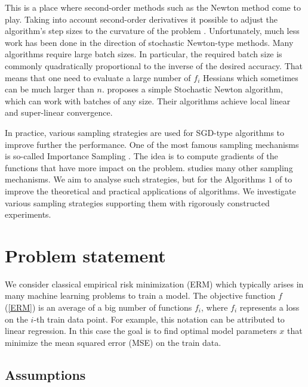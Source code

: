 \documentclass{article}
\theoremstyle{definition}
\theoremstyle{assumption}
\theoremstyle{lemma}
\theoremstyle{theorem}
\theoremstyle{proposition}
\begin{document}
	This is a place where second-order methods such as the Newton method \cite{Nesterov-introductory, Newton-convergence, RSN} come to play. Taking into account second-order derivatives it possible to adjust the algorithm's step sizes to the curvature of the problem \cite{Nesterov-introductory}. Unfortunately, much less work has been done in the direction of stochastic Newton-type methods. Many algorithms \cite{sub-sampled, exact-inexact, variance-reduced-Newton, zhang2022adaptive, tripuraneni2018stochastic, zhou2020stochastic} require large batch sizes. In particular, the required batch size is commonly quadratically proportional to the inverse of the desired accuracy. That means that one need to evaluate a large number of $f_i$ Hessians which sometimes can be much larger than $n$. \cite{kovalev2019stochastic} proposes a simple Stochastic Newton algorithm, which can work with batches of any size. Their algorithms achieve local linear and super-linear convergence. 
	
	In practice, various sampling strategies are used for SGD-type algorithms to improve further the performance. One of the most famous sampling mechanisms is so-called Importance Sampling \cite{https://doi.org/10.48550/arxiv.1401.2753, 9413313}. The idea is to compute gradients of the functions that have more impact on the problem. \cite{richtarik2016parallel} studies many other sampling mechanisms. We aim to analyse such strategies, but for the Algorithms $1$ of \cite{kovalev2019stochastic} to improve the theoretical and practical applications of algorithms. We investigate various sampling strategies supporting them with  rigorously constructed experiments. 
	
\section{Problem statement}

	We consider classical empirical risk minimization (ERM) which typically arises in many machine learning problems to train a model. The objective function $f$ (\ref{ERM}) is an average of a big number of functions $f_i$, where $f_i$ represents a loss on the $i$-th train data point. For example, this notation can be attributed to linear regression. In this case the goal is to find optimal model parameters $x$ that minimize the mean squared error (MSE) on the train data.
	
	\subsection{Assumptions}
	
\end{document}
